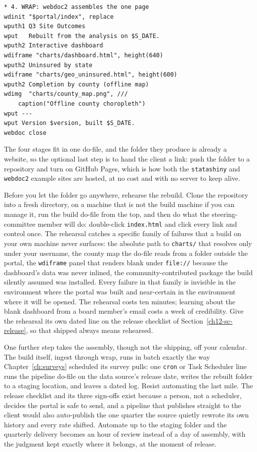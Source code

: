 \documentclass[
    a4paper,
    fontsize=10pt,
    twoside=true,
    numbers=noenddot,
]{kaobook}
\begin{document}
\par
{\footnotesize
\begin{verbatim}
* 4. WRAP: webdoc2 assembles the one page
wdinit "$portal/index", replace
wputh1 Q3 Site Outcomes
wput   Rebuilt from the analysis on $S_DATE.
wputh2 Interactive dashboard
wdiframe "charts/dashboard.html", height(640)
wputh2 Uninsured by state
wdiframe "charts/geo_uninsured.html", height(600)
wputh2 Completion by county (offline map)
wdimg  "charts/county_map.png", ///
    caption("Offline county choropleth")
wput ---
wput Version $version, built $S_DATE.
webdoc close
\end{verbatim}
}
The four stages fit in one do-file, and the folder they produce is already a website, so the optional last step is to hand the client a link: push the folder to a repository and turn on GitHub Pages, which is how both the \texttt{statashiny} and \texttt{webdoc2} example sites are hosted, at no cost and with no server to keep alive.

Before you let the folder go anywhere, rehearse the rebuild. Clone the repository into a fresh directory, on a machine that is not the build machine if you can manage it, run the build do-file from the top, and then do what the steering-committee member will do: double-click \texttt{index.html} and click every link and control once. The rehearsal catches a specific family of failures that a build on your own machine never surfaces: the absolute path to \texttt{charts/} that resolves only under your username, the county map the do-file reads from a folder outside the portal, the \texttt{wdiframe} panel that renders blank under \texttt{file://} because the dashboard's data was never inlined, the community-contributed package the build silently assumed was installed. Every failure in that family is invisible in the environment where the portal was built and near-certain in the environment where it will be opened. The rehearsal costs ten minutes; learning about the blank dashboard from a board member's email costs a week of credibility. Give the rehearsal its own dated line on the release checklist of Section~\ref{ch12-sc-release}, so that shipped always means rehearsed.

One further step takes the assembly, though not the shipping, off your calendar. The build itself, ingest through wrap, runs in batch exactly the way Chapter~\ref{ch:surveys} scheduled its survey pulls: one \texttt{cron} or Task Scheduler line runs the pipeline do-file on the data source's release date, writes the rebuilt folder to a staging location, and leaves a dated log. Resist automating the last mile. The release checklist and its three sign-offs exist because a person, not a scheduler, decides the portal is safe to send, and a pipeline that publishes straight to the client would also auto-publish the one quarter the source quietly rewrote its own history and every rate shifted. Automate up to the staging folder and the quarterly delivery becomes an hour of review instead of a day of assembly, with the judgment kept exactly where it belongs, at the moment of release.
\end{document}
